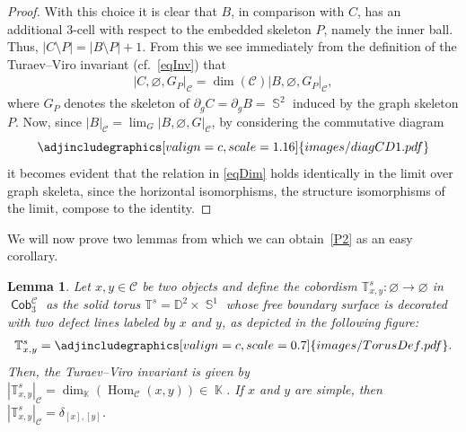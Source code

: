 \documentclass[10pt,a4paper]{amsart}
\DeclareMathOperator{\Hom}{Hom}
\DeclareMathOperator{\K}{\mathbb{K}}
\DeclareMathOperator{\Sp}{\mathbb{S}}
\DeclareMathOperator{\Cob}{\mathsf{Cob}}
\numberwithin{equation}{section}
\newtheorem{Lemma}[Lemma]{Lemma}
\theoremstyle{definition}
\begin{document}
\begin{proof}
 With this choice it is clear that $B$, in comparison with $C$, has an additional 3-cell with respect to the embedded skeleton $P$, namely the inner ball. Thus, $|C\setminus P| = |B \setminus P| +1$. From this we see immediately from the definition of the Turaev--Viro invariant (cf.~\eqref{eqInv}) that
 \begin{align}
 \label{eqDim}
 |C, \varnothing, G_P|_{\mathcal{C}} = \dim(\mathcal{C}) |B, \varnothing, G_P|_{\mathcal{C}},
 \end{align}
 where $G_P$ denotes the skeleton of $\partial_gC = \partial_gB = \Sp^2$ induced by the graph skeleton $P$. Now, since $|B|_{\mathcal{C}} = \lim_G|B, \varnothing, G|_{\mathcal{C}}$, by considering the commutative diagram
 \[
 \centering
 \adjincludegraphics[valign=c, scale = 1.16]{images/diagCD1.pdf}
 \]
 it becomes evident that the relation in \eqref{eqDim} holds identically in the limit over graph skeleta, since the horizontal isomorphisms, the structure isomorphisms of the limit, compose to the identity.
\end{proof}

We will now prove two lemmas from which we can obtain~\ref{P2} as an easy corollary.

\begin{Lemma}
\label{lemTorxy}
 Let $x, y \in \mathcal{C}$ be two objects and define the cobordism $\mathbb{T}_{x,y}^s\colon \varnothing \rightarrow \varnothing$ in $\Cob_3^{\mathcal{C}}$ as the solid torus $\mathbb{T}^s = \mathbb{D}^2 \times \Sp^1$ whose free boundary surface is decorated with two defect lines labeled by $x$ and $y$, as depicted in the following figure:
 \begin{align*}
 \mathbb{T}_{x,y}^s = \adjincludegraphics[valign=c, scale = 0.7]{images/TorusDef.pdf}.
 \end{align*}
 Then, the Turaev--Viro invariant is given by $|\mathbb{T}_{x,y}^s|_{\mathcal{C}} = \dim_{\K}\left( \Hom_{\mathcal{C}}(x, y) \right) \in \K$. If $x$ and $y$ are simple, then $|\mathbb{T}_{x,y}^s|_{\mathcal{C}} = \delta_{[x], [y]}$.
\end{Lemma}
\end{document}
